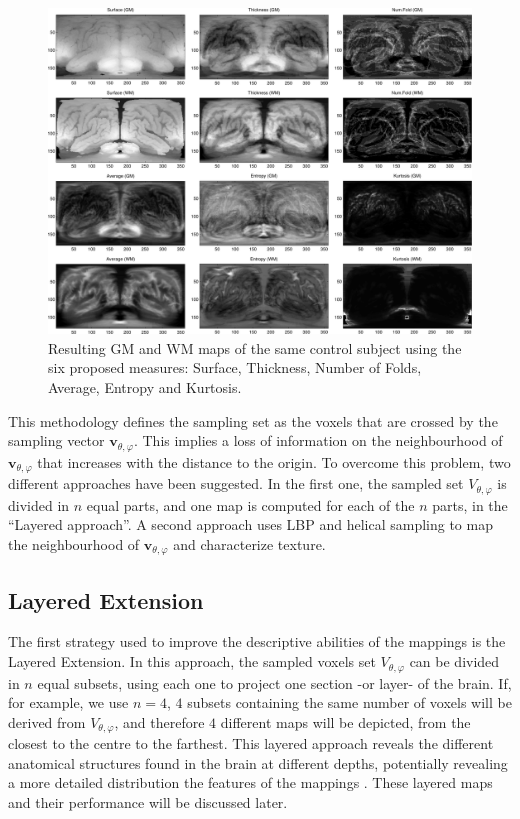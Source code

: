 \begin{figure}[htp]
	\centering
	\includegraphics[width=1\textwidth]{Graphics/ch6/03-projections}
	\caption{Resulting \ac{GM} and \ac{WM} maps of the same control subject using the six proposed measures: Surface, Thickness, Number of Folds, Average, Entropy and Kurtosis.}
	\label{fig:masksGM}
\end{figure}

This methodology defines the sampling set as the voxels that are crossed by the sampling vector $\mathbf{v}_{\theta,\varphi}$. This implies a loss of information on the neighbourhood of $\mathbf{v}_{\theta,\varphi}$ that increases with the distance to the origin. To overcome this problem, two different approaches have been suggested. In the first one, the sampled set $V_{\theta,\varphi}$ is divided in $n$ equal parts, and one map is computed for each of the $n$ parts, in the ``Layered approach''. A second approach uses \acf{LBP} and helical sampling to map the neighbourhood of $\mathbf{v}_{\theta,\varphi}$ and characterize texture. 


\subsection{Layered Extension}\label{sec:layered}
The first strategy used to improve the descriptive abilities of the mappings is the Layered Extension. In this approach, the sampled voxels set $V_{\theta,\varphi}$ can be divided in $n$ equal subsets, using each one to project one section -or layer- of the brain. If, for example, we use $n=4$, $4$ subsets containing the same number of voxels  will be derived from $V_{\theta,\varphi}$, and therefore $4$ different maps  will be depicted, from the closest to the centre to the farthest. This layered approach reveals  the different anatomical structures found in the brain at different depths, potentially revealing a more detailed distribution the features  of the mappings . These layered maps and their performance will be discussed later.


